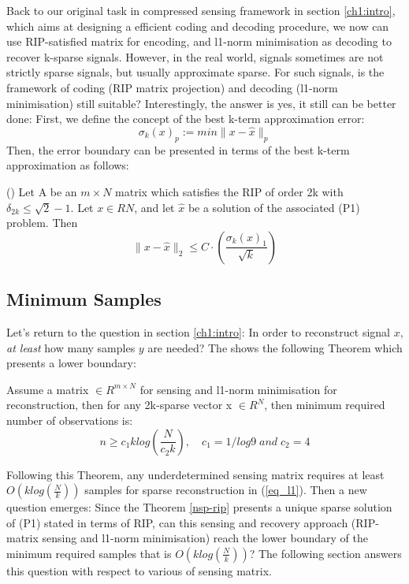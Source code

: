 Back to our original task in compressed sensing framework in section \ref{ch1:intro}, which aims at designing a efficient coding and decoding procedure, we now can use RIP-satisfied matrix for encoding, and l1-norm minimisation as decoding to recover k-sparse signals. However, in the real world, signals sometimes are not strictly sparse signals, but usually approximate sparse.
For such signals, is the framework of coding (RIP matrix projection) and decoding (l1-norm minimisation) still suitable? Interestingly, the answer is yes, it still can be better done: First, we define the concept of the best k-term approximation error:
\begin{equation}
\sigma_k(x)_p := min \| x - \hat x \|_p
\end{equation}
Then, the error boundary can be presented in terms of the best k-term approximation as follows:
\begin{theorem}
(\cite{candes2006robust}) Let A be an $m \times N $ matrix which satisfies the RIP of order 2k with $\delta_{2k} \leq \sqrt{2}-1$. Let $x \in RN$, and let $\hat x$ be a solution of the associated (P1) problem. Then
\begin{equation}
\label{robust-l1}
\| x-\hat x \|_2 \leq C \cdot ( \frac{{\sigma_k(x)}_1}{\sqrt k} )
\end{equation}
\end{theorem}

\subsection{Minimum Samples}

Let’s return to the question in section \ref{ch1:intro}: In order to reconstruct signal $x$, \emph{at least} how many samples $y$ are needed? The \cite{gribonval2003sparse} shows the following Theorem which presents a lower boundary:
\begin{theorem}
\label{min-sample}
Assume a matrix $\in R^{m \times N}$ for sensing and l1-norm minimisation for reconstruction, then for any 2k-sparse vector x $\in R^{N}$, then minimum required number of observations is:
\begin{equation}
n \geq c_1 k log(\frac{N}{c_2 k}), \quad c_1 = 1/log 9 \; and \; c_2 = 4
\end{equation}
\end{theorem}
Following this Theorem, any underdetermined sensing matrix requires at least $O(k log(\frac{N}{k}))$ samples for sparse reconstruction in (\ref{eq_l1}). Then a new question emerges: Since the Theorem \ref{nsp-rip} presents a unique sparse solution of (P1) stated in terms of RIP, can this sensing and recovery approach (RIP-matrix sensing and l1-norm minimisation) reach the lower boundary of the minimum required samples that is $O(k log(\frac{N}{k}))$? The following section answers this question with respect to various of sensing matrix.

